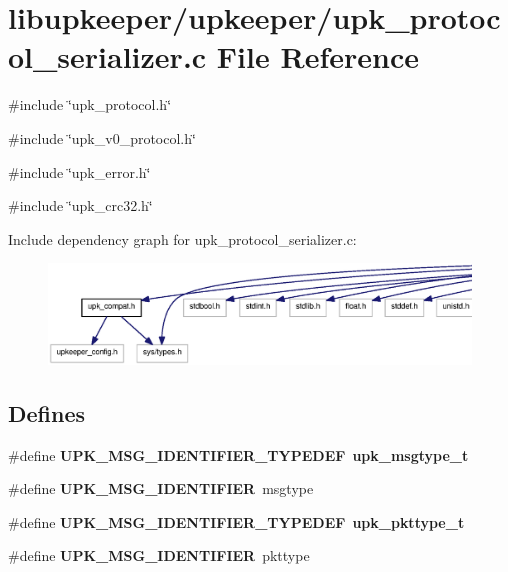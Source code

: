 \section{libupkeeper/upkeeper/upk\_\-protocol\_\-serializer.c File Reference}
\label{upk__protocol__serializer_8c}
{\ttfamily \#include \char`\"{}upk\_\-protocol.h\char`\"{}}\par
{\ttfamily \#include \char`\"{}upk\_\-v0\_\-protocol.h\char`\"{}}\par
{\ttfamily \#include \char`\"{}upk\_\-error.h\char`\"{}}\par
{\ttfamily \#include \char`\"{}upk\_\-crc32.h\char`\"{}}\par
Include dependency graph for upk\_\-protocol\_\-serializer.c:\nopagebreak
\begin{figure}[H]
\begin{center}
\leavevmode
\includegraphics[width=400pt]{upk__protocol__serializer_8c__incl}
\end{center}
\end{figure}
\subsection*{Defines}
\begin{DoxyCompactItemize}
\item 
\#define {\bf UPK\_\-MSG\_\-IDENTIFIER\_\-TYPEDEF}~{\bf upk\_\-msgtype\_\-t}
\item 
\#define {\bf UPK\_\-MSG\_\-IDENTIFIER}~msgtype
\item 
\#define {\bf UPK\_\-MSG\_\-IDENTIFIER\_\-TYPEDEF}~{\bf upk\_\-pkttype\_\-t}
\item 
\#define {\bf UPK\_\-MSG\_\-IDENTIFIER}~pkttype
\end{DoxyCompactItemize}
